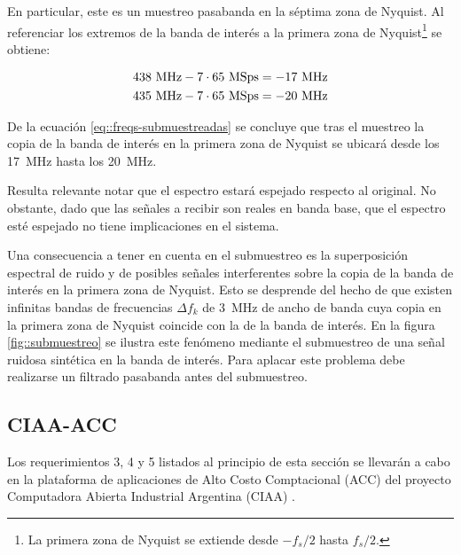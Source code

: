 \documentclass[../../main.tex]{subfiles}
\begin{document}
En particular, este es un muestreo pasabanda en la séptima zona de Nyquist. Al referenciar los extremos de la banda de interés a la primera zona de Nyquist\footnote{La primera zona de Nyquist se extiende desde $-f_s/2$ hasta $f_s/2$.} se obtiene:

\begin{equation}
\!
\begin{aligned}
438~\textrm{MHz} - 7 \cdot 65~\textrm{MSps} = -17~\textrm{MHz} \\
435~\textrm{MHz} - 7 \cdot 65~\textrm{MSps} = -20~\textrm{MHz} 
\end{aligned}
\label{eq::freqs-submuestreadas}
\end{equation}

De la ecuación \ref{eq::freqs-submuestreadas} se concluye que tras el muestreo la copia de la banda de interés en la primera zona de Nyquist se ubicará desde los 17~MHz hasta los 20~MHz. 

Resulta relevante notar que el espectro estará espejado respecto al original. No obstante, dado que las señales a recibir son reales en banda base, que el espectro esté espejado no tiene implicaciones en el sistema. 

Una consecuencia a tener en cuenta en el submuestreo es la superposición espectral de ruido y de posibles señales interferentes sobre la copia de la banda de interés en la primera zona de Nyquist. Esto se desprende del hecho de que existen infinitas bandas de frecuencias $\Delta f_k$ de 3~MHz de ancho de banda cuya copia en la primera zona de Nyquist coincide con la de la banda de interés. 
En la figura \ref{fig::submuestreo} se ilustra este fenómeno mediante el submuestreo de una señal ruidosa sintética en la banda de interés. Para aplacar este problema debe realizarse un filtrado pasabanda antes del submuestreo.



\subsection{CIAA-ACC}
Los requerimientos 3, 4 y 5 listados al principio de esta sección se llevarán a cabo en la plataforma de aplicaciones de Alto Costo Comptacional (ACC) \cite{CIAA-ACC} del proyecto Computadora Abierta Industrial Argentina (CIAA) \cite{CIAA}.

\end{document}
